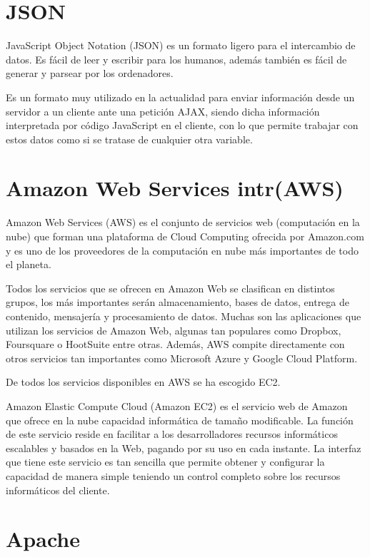 \section{JSON} 
\label{sec:json}


JavaScript Object Notation (JSON) es un formato ligero para el intercambio de datos. Es fácil de leer y escribir para los humanos, además también es fácil de generar y parsear por los ordenadores.


Es un formato muy utilizado en la actualidad para enviar información desde un servidor a un cliente ante una petición AJAX, siendo dicha información interpretada por código JavaScript en el cliente, con lo que permite trabajar con estos datos como si se tratase de cualquier otra variable.



\section{Amazon Web Services intr(AWS)} 
\label{sec:aws}

Amazon Web Services (AWS) es el conjunto de servicios web (computación en la nube) que forman una plataforma de Cloud Computing ofrecida por Amazon.com y es uno de los proveedores de la computación en nube más importantes de todo el planeta.


Todos los servicios que se ofrecen en Amazon Web se clasifican en distintos grupos, los más importantes serán almacenamiento, bases de datos, entrega de contenido, mensajería y procesamiento de datos. Muchas son las aplicaciones que utilizan los servicios de Amazon Web, algunas tan populares como Dropbox, Foursquare o HootSuite entre otras. Además, AWS compite directamente con otros servicios tan importantes como Microsoft Azure y Google Cloud Platform.


De todos los servicios disponibles en AWS se ha escogido EC2.


Amazon Elastic Compute Cloud (Amazon EC2) es el servicio web de Amazon que ofrece en la nube capacidad informática de tamaño modificable. La función de este servicio reside en facilitar a los desarrolladores recursos informáticos escalables y basados en la Web, pagando por su uso en cada instante. La interfaz que tiene este servicio es tan sencilla que permite obtener y configurar la capacidad de manera simple teniendo un control completo sobre los recursos informáticos del cliente.



\section{Apache} 
\label{sec:apache}

